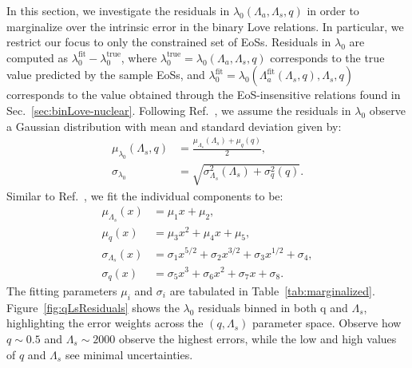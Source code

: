 \documentclass[prd,twocolumn,nofootinbib,superscriptaddress,amsmath,amssymb]{revtex4-1}
\begin{document}
In this section, we investigate the residuals in $\lambda_0(\Lambda_a,\Lambda_s,q)$ in order to marginalize over the intrinsic error in the binary Love relations.
In particular, we restrict our focus to only the constrained set of EoSs.
Residuals in $\lambda_0$ are computed as $\lambda_0^{\text{fit}}-\lambda_0^{\text{true}}$, where $\lambda_0^{\text{true}}=\lambda_0(\Lambda_a,\Lambda_s,q)$ corresponds to the true value predicted by the sample EoSs, and $\lambda_0^{\text{fit}}=\lambda_0(\Lambda_a^{\text{fit}}(\Lambda_s,q),\Lambda_s,q)$ corresponds to the value obtained through the EoS-insensitive relations found in Sec.~\ref{sec:binLove-nuclear}.
Following Ref.~\cite{Katerina:residuals}, we assume the residuals in $\lambda_0$ observe a Gaussian distribution with mean and standard deviation given by:
\begin{align}
\mu_{\lambda_0}(\Lambda_s,q) &=\frac{\mu_{\Lambda_s}(\Lambda_s)+\mu_{q}(q)}{2},\\ 
\sigma_{\lambda_0} &=\sqrt{\sigma_{\Lambda_s}^2(\Lambda_s) + \sigma_{q}^2(q)}. 
\end{align}
Similar to Ref.~\cite{Katerina:residuals}, we fit the individual components to be:
\begin{align}
\mu_{\Lambda_s}(x) &= \mu_1 x + \mu_2, \label{eq:margFit1}\\ 
\mu_{q}(x) &= \mu_3 x^2 + \mu_4 x + \mu_5, \label{eq:margFit2}\\ 
\sigma_{\Lambda_s}(x) &= \sigma_1 x^{5/2} + \sigma_2 x^{3/2} +  \sigma_3 x^{1/2} + \sigma_4, \label{eq:margFit3}\\ 
\sigma_{q}(x) &= \sigma_5 x^3 + \sigma_6 x^2 + \sigma_7 x + \sigma_8. \label{eq:margFit4}
\end{align}
The fitting parameters $\mu_i$ and $\sigma_i$ are tabulated in Table~\ref{tab:marginalized}.
Figure~\ref{fig:qLsResiduals} shows the $\lambda_0$ residuals binned in both q and $\Lambda_s$, highlighting the error weights across the $(q,\Lambda_s)$ parameter space.
Observe how $q\sim0.5$ and $\Lambda_s\sim2000$ observe the highest errors, while the low and high values of $q$ and $\Lambda_s$ see minimal uncertainties.
\end{document}

